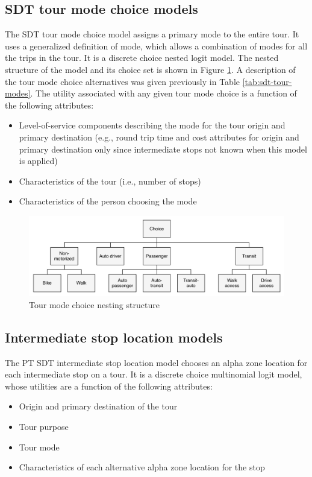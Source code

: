 \subsection{SDT tour mode choice models}\label{sec:sdt-tour-mode-choice}
The SDT tour mode choice model assigns a primary mode to the entire tour. It uses a generalized definition of mode, which allows a combination of modes for all the trips in the tour. It is a discrete choice nested logit model. The nested structure of the model and its choice set is shown in Figure \ref{fig:sdt-tour-mode-nesting}. A description of the tour mode choice alternatives was given previously in Table \ref{tab:sdt-tour-modes}. The utility associated with any given tour mode choice is a function of the following attributes:
\begin{itemize}
\item Level-of-service components describing the mode for the tour origin and primary destination (e.g., round trip time and cost attributes for origin and primary destination only since intermediate stops not known when this model is applied)
\item Characteristics of the tour (i.e., number of stops)
\item Characteristics of the person choosing the mode
\end{itemize}

\begin{figure}
\centering
\includegraphics[width=6in]{pt/nesting}
\caption{Tour mode choice nesting structure}\label{fig:sdt-tour-mode-nesting}
\end{figure}

\subsection{Intermediate stop location models}
The PT SDT intermediate stop location model chooses an alpha zone location for each intermediate stop on a tour. It is a discrete choice multinomial logit model, whose utilities are a function of the following attributes:
\begin{itemize}
\item Origin and primary destination of the tour
\item Tour purpose
\item Tour mode
\item Characteristics of each alternative alpha zone location for the stop
\end{itemize}

